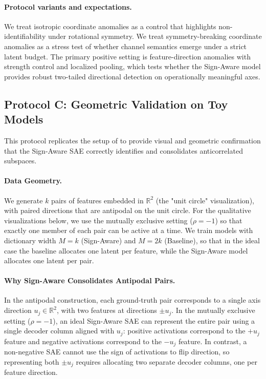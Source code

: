 \documentclass{article}
\newcommand{\R}{\mathbb{R}}
\begin{document}
\paragraph{Protocol variants and expectations.}
We treat isotropic coordinate anomalies as a control that highlights non-identifiability under rotational symmetry. We treat symmetry-breaking coordinate anomalies as a stress test of whether channel semantics emerge under a strict latent budget. The primary positive setting is feature-direction anomalies with strength control and localized pooling, which tests whether the Sign-Aware model provides robust two-tailed directional detection on operationally meaningful axes.

\subsection{Protocol C: Geometric Validation on Toy Models}
This protocol replicates the setup of \cite{elhage2022toy} to provide visual and geometric confirmation that the Sign-Aware SAE correctly identifies and consolidates anticorrelated subspaces.

\paragraph{Data Geometry.}
We generate $k$ pairs of features embedded in $\R^2$ (the "unit circle" visualization), with paired directions that are antipodal on the unit circle.
For the qualitative visualizations below, we use the mutually exclusive setting ($\rho=-1$) so that exactly one member of each pair can be active at a time.
We train models with dictionary width $M=k$ (Sign-Aware) and $M=2k$ (Baseline), so that in the ideal case the baseline allocates one latent per feature, while the Sign-Aware model allocates one latent per pair.

\paragraph{Why Sign-Aware Consolidates Antipodal Pairs.}
In the antipodal construction, each ground-truth pair corresponds to a single axis direction $u_j \in \R^2$, with two features at directions $\pm u_j$.
In the mutually exclusive setting ($\rho=-1$), an ideal Sign-Aware SAE can represent the entire pair using a single decoder column aligned with $u_j$:
positive activations correspond to the $+u_j$ feature and negative activations correspond to the $-u_j$ feature.
In contrast, a non-negative SAE cannot use the sign of activations to flip direction, so representing both $\pm u_j$ requires allocating two separate decoder columns, one per feature direction.
\end{document}

